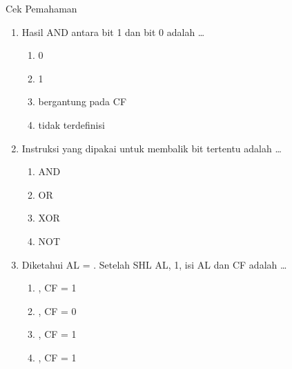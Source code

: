 \documentclass[aspectratio=169,11pt]{beamer}
\begin{document}
\begin{frame}{Cek Pemahaman}
\footnotesize
\begin{enumerate}
    \item Hasil AND antara bit 1 dan bit 0 adalah \dots
          \begin{enumerate}
              \item 0 \quad \item 1 \quad
              \item bergantung pada CF \quad
              \item tidak terdefinisi
          \end{enumerate}

    \vspace{0.2em}
    \item Instruksi yang dipakai untuk membalik bit tertentu
          adalah \dots
          \begin{enumerate}
              \item AND \quad \item OR \quad
              \item XOR \quad \item NOT
          \end{enumerate}

    \vspace{0.2em}
    \item Diketahui AL = . Setelah SHL AL, 1, isi AL
          dan CF adalah \dots
          \begin{enumerate}
              \item {}, CF = 1
              \item {}, CF = 0
              \item {}, CF = 1
              \item {}, CF = 1
          \end{enumerate}
\end{enumerate}
\end{frame}
\end{document}
